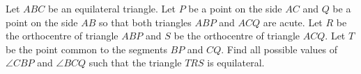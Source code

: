 Let $ABC$ be an equilateral triangle. Let $P$ be a point on the side $AC$ and $Q$ be a point on the side $AB$ so that both triangles $ABP$ and $ACQ$ are acute. Let $R$ be the orthocentre of triangle $ABP$ and $S$ be the orthocentre of triangle $ACQ$. Let $T$ be the point common to the segments $BP$ and $CQ$. Find all possible values of $\angle CBP$ and $\angle BCQ$ such that the triangle $TRS$ is equilateral.